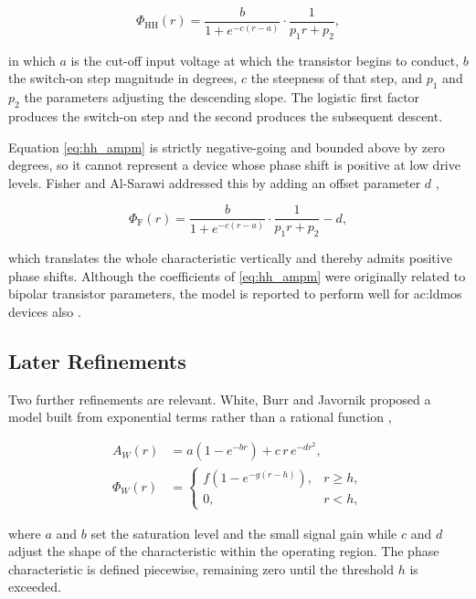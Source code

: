 \begin{equation}
  \Phi_{\text{HH}}(r) = \frac{b}{1 + e^{-c(r-a)}} \cdot \frac{1}{p_1 r + p_2},
  \label{eq:hh_ampm}
\end{equation}

in which $a$ is the cut-off input voltage at which the transistor begins to conduct, $b$ the switch-on step magnitude in degrees, $c$ the steepness of that step, and $p_1$ and $p_2$ the parameters adjusting the descending slope. The logistic first factor produces the switch-on step and the second produces the subsequent descent.

Equation \eqref{eq:hh_ampm} is strictly negative-going and bounded above by zero degrees, so it cannot represent a device whose phase shift is positive at low drive levels. Fisher and Al-Sarawi addressed this by adding an offset parameter $d$ \cite{fisher},

\begin{equation}
  \Phi_{\text{F}}(r) = \frac{b}{1 + e^{-c(r-a)}} \cdot \frac{1}{p_1 r + p_2} - d,
  \label{eq:fisher_ampm}
\end{equation}

which translates the whole characteristic vertically and thereby admits positive phase shifts. Although the coefficients of \eqref{eq:hh_ampm} were originally related to bipolar transistor parameters, the model is reported to perform well for \gls{ac:ldmos} devices also \cite{fisher}.

\subsection{Later Refinements}\label{sec:later_pa_models}

Two further refinements are relevant. White, Burr and Javornik proposed a model built from exponential terms rather than a rational function \cite{white},

\begin{align}
  A_W(r)    &= a\left(1 - e^{-br}\right) + c\,r\,e^{-dr^2}, \label{eq:white_amam} \\
  \Phi_W(r) &= \begin{cases}
                 f\left(1 - e^{-g(r-h)}\right), & r \geq h, \\
                 0,                              & r < h,
               \end{cases} \label{eq:white_ampm}
\end{align}

where $a$ and $b$ set the saturation level and the small signal gain while $c$ and $d$ adjust the shape of the characteristic within the operating region. The phase characteristic is defined piecewise, remaining zero until the threshold $h$ is exceeded.

